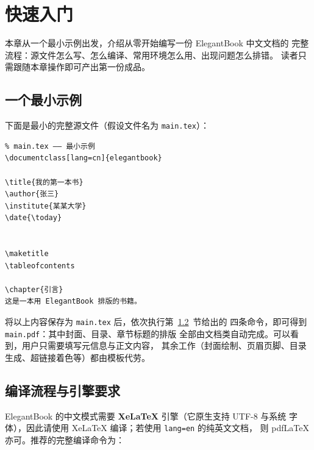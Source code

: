 
\chapter{快速入门}

本章从一个最小示例出发，介绍从零开始编写一份 ElegantBook 中文文档的
完整流程：源文件怎么写、怎么编译、常用环境怎么用、出现问题怎么排错。
读者只需跟随本章操作即可产出第一份成品。

\section{一个最小示例}

下面是最小的完整源文件（假设文件名为 \texttt{main.tex}）：

\begin{lstlisting}
% main.tex —— 最小示例
\documentclass[lang=cn]{elegantbook}

\title{我的第一本书}
\author{张三}
\institute{某某大学}
\date{\today}


\maketitle
\tableofcontents

\chapter{引言}
这是一本用 ElegantBook 排版的书籍。

\end{lstlisting}

将以上内容保存为 \texttt{main.tex} 后，依次执行第~\ref{sec:compile}~节给出的
四条命令，即可得到 \texttt{main.pdf}：其中封面、目录、章节标题的排版
全部由文档类自动完成。可以看到，用户只需要填写元信息与正文内容，
其余工作（封面绘制、页眉页脚、目录生成、超链接着色等）都由模板代劳。

\section{编译流程与引擎要求}\label{sec:compile}

ElegantBook 的中文模式需要 \textbf{XeLaTeX} 引擎（它原生支持 UTF-8 与系统
字体），因此请使用 XeLaTeX 编译；若使用 \texttt{lang=en} 的纯英文文档，
则 pdfLaTeX 亦可。推荐的完整编译命令为：

